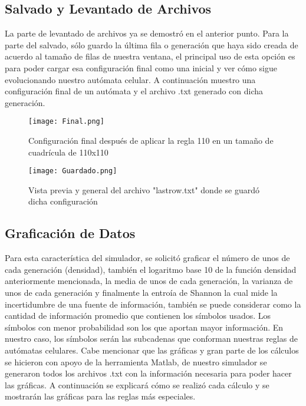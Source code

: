 \documentclass{article}
\begin{document}
	\vspace{300pt}
	\subsection{Salvado y Levantado de Archivos}
	
	La parte de levantado de archivos ya se demostró en el anterior punto. Para la parte del salvado, sólo guardo la última fila o generación que haya sido creada de acuerdo al tamaño de filas de nuestra ventana, el principal uso de esta opción es para poder cargar esa configuración final como una inicial y ver cómo sigue evolucionando nuestro autómata celular. A continuación muestro una configuración final de un autómata y el archivo .txt generado con dicha generación. 
	
	
	\begin{figure}[h]
		\centering       
		\texttt{[image: Final.png]}
		\caption{Configuración final después de aplicar la regla 110 en un tamaño de cuadrícula de 110x110}
		\label{fig:mi_imagen1}
	\end{figure}
	
		\vspace{300pt}
		
	\begin{figure}[h]
		\centering       
		\texttt{[image: Guardado.png]}
		\caption{Vista previa y general del archivo "lastrow.txt" donde se guardó dicha configuración}
		\label{fig:mi_imagen1}
	\end{figure}
	
	
	\subsection{Graficación de Datos}
	
	Para esta característica del simulador, se solicitó graficar el número de unos de cada generación (densidad), también el logaritmo base 10 de la función densidad anteriormente mencionada, la media de unos de cada generación, la varianza de unos de cada generación y finalmente la entroía de Shannon la cual mide la incertidumbre de una fuente de información, también se puede considerar como la cantidad de información promedio que contienen los símbolos usados. Los símbolos con menor probabilidad son los que aportan mayor información. En nuestro caso, los símbolos serán las subcadenas que conforman nuestras reglas de autómatas celulares. 
	Cabe mencionar que las gráficas y gran parte de los cálculos se hicieron con apoyo de la herramienta Matlab, de nuestro simulador se generaron todos los archivos .txt con la información necesaria para poder hacer las gráficas. 
	\newline
	A continuación se explicará cómo se realizó cada cálculo y se mostrarán las gráficas para las reglas más especiales. 
	\newline
	\newline
	\newline
	
\end{document}
